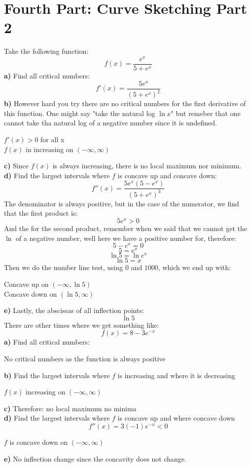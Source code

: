 \documentclass[12pt, letterpaper]{article}
\begin{document}
\section{Fourth Part: Curve Sketching Part 2}
Take the following function:
\[f(x)=\frac{e^x}{5+e^x}\]
\textbf{a)} Find all critical numbers:
\[f'(x)=\frac{5e^x}{(5+e^x)^2}\]
\textbf{b)} However hard you try there are no critical numbers for the first derivative of this function. One might say "take the natural log \(\ln{x}\)" but remeber that one cannot take tha natural log of a negative number since it is undefined. 
\begin{center}
    \(f'(x) > 0\) for all x\\
    \(f(x)\) in increasing on \((-\infty, \infty)\)
\end{center}
\textbf{c)} Since \(f(x)\) is always increasing, there is no local maximum nor minimum.\\
\newline
\textbf{d)} Find the largest intervals where \(f\) is concave up and concave down:
\[f''(x) = \frac{5e^x(5-e^x)}{(5+e^x)^3}\]
The denominator is always positive, but in the case of the numerator, we find that the first product is:
\[5e^x > 0\]
And the for the second product, remember when we said that we cannot get the \(\ln\) of a negative number, well here we have a positive number for, therefore:
\[5-e^x = 0\]
\[5=e^x\]
\[\ln{5}=\ln{e^x}\]
\[\ln{5}=x\]
Then we do the number line test, using \(0\) and \(1000\), which we end up with:
\begin{center}
    Concave up on \((-\infty, \ln{5})\)\\
    Concave down on \((\ln{5},\infty)\)
\end{center}
\textbf{e)} Lastly, the abscissas of all inflection points:
\[\ln{5}\]
There are other times where we get something like:
\[f(x)=8-3e^{-x}\]
\textbf{a)} Find all critical numbers:
\begin{center}
    No critical numbers as the function is always positive
\end{center}
\textbf{b)} Find the largest intervals where \(f\) is increasing and where it is decreasing
\begin{center}
    \(f(x)\) increasing on \((-\infty,\infty)\)
\end{center}
\textbf{c)} Therefore: no local maximum no minima\\
\newline
\textbf{d)} Find the largest intervals where \(f\) is concave up and where concave down
\[f''(x)=3(-1)e^{-x} < 0\]
\begin{center}
    \(f\) is concave down on \((-\infty,\infty)\)
\end{center}
\textbf{e)} No inflection change since the concavity does not change.
\end{document}
